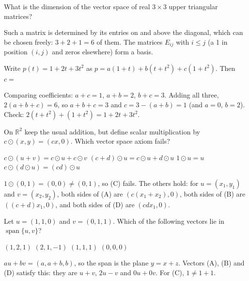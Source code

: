 \begin{question}[id=vs-12]
What is the dimension of the vector space of real $3 \times 3$ upper triangular matrices?
\begin{solution}
Such a matrix is determined by its entries on and above the diagonal, which can be chosen freely: $3 + 2 + 1 = 6$ of them. The matrices $E_{ij}$ with $i \le j$ (a 1 in position $(i, j)$ and zeros elsewhere) form a basis.
\end{solution}
\end{question}

\begin{question}[id=vs-13, marks=2]
Write $p(t) = 1 + 2t + 3t^2$ as $p = a(1 + t) + b(t + t^2) + c(1 + t^2)$. Then $c =$
\begin{solution}
Comparing coefficients: $a + c = 1$, $a + b = 2$, $b + c = 3$. Adding all three, $2(a + b + c) = 6$, so $a + b + c = 3$ and $c = 3 - (a + b) = 1$ (and $a = 0$, $b = 2$). Check: $2(t + t^2) + (1 + t^2) = 1 + 2t + 3t^2$.
\end{solution}
\end{question}

\begin{question}[id=vs-14, marks=2]
On $\mathbb{R}^2$ keep the usual addition, but define scalar multiplication by $c \odot (x, y) = (cx, 0)$. Which vector space axiom fails?
\begin{options}
  \option $c \odot (u + v) = c \odot u + c \odot v$
  \option $(c + d) \odot u = c \odot u + d \odot u$
  \correct $1 \odot u = u$
  \option $c \odot (d \odot u) = (cd) \odot u$
\end{options}
\begin{solution}
$1 \odot (0, 1) = (0, 0) \ne (0, 1)$, so (C) fails. The others hold: for $u = (x_1, y_1)$ and $v = (x_2, y_2)$, both sides of (A) are $(c(x_1 + x_2), 0)$, both sides of (B) are $((c + d)x_1, 0)$, and both sides of (D) are $(cdx_1, 0)$.
\end{solution}
\end{question}

\begin{question}[id=vs-15, type=msq, marks=2]
Let $u = (1, 1, 0)$ and $v = (0, 1, 1)$. Which of the following vectors lie in $\operatorname{span}\{u, v\}$?
\begin{options}
  \correct $(1, 2, 1)$
  \correct $(2, 1, -1)$
  \option $(1, 1, 1)$
  \correct $(0, 0, 0)$
\end{options}
\begin{solution}
$au + bv = (a, a + b, b)$, so the span is the plane $y = x + z$. Vectors (A), (B) and (D) satisfy this: they are $u + v$, $2u - v$ and $0u + 0v$. For (C), $1 \ne 1 + 1$.
\end{solution}
\end{question}

